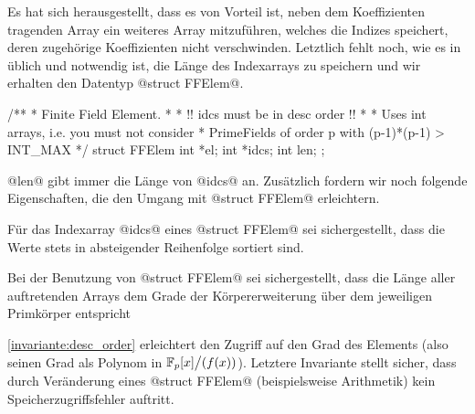 Es hat sich herausgestellt, dass es von Vorteil ist, neben dem Koeffizienten
tragenden Array ein weiteres Array mitzuführen, welches die
Indizes speichert, deren zugehörige Koeffizienten nicht verschwinden. Letztlich
fehlt noch, wie es in \Clang üblich und notwendig ist, die Länge des
Indexarrays zu speichern und wir erhalten den Datentyp @struct FFElem@.

\begin{ccode}[caption={Aus \url{../Sage/enumeratePCNs.c}},
  firstnumber=15]
/**
 * Finite Field Element. 
 * 
 * !! idcs must be in desc order !!
 *
 * Uses int arrays, i.e. you must not consider 
 * PrimeFields of order p with  (p-1)*(p-1) > INT_MAX
 */
struct FFElem{
    int *el;
    int *idcs;
    int len;
};
\end{ccode}

@len@ gibt immer die Länge von @idcs@ an. Zusätzlich fordern wir noch folgende
Eigenschaften, die den Umgang mit @struct FFElem@ erleichtern.

\begin{invariante}
  \label{invariante:desc_order}
  Für das Indexarray @idcs@ eines @struct FFElem@ sei sichergestellt, 
  dass die Werte stets in absteigender Reihenfolge sortiert sind. 
\end{invariante}

\begin{invariante}
  \label{invariante:array_len}
  Bei der Benutzung von @struct FFElem@ sei sichergestellt, 
  dass die Länge aller auftretenden Arrays dem Grade der 
  Körpererweiterung über dem jeweiligen Primkörper entspricht
\end{invariante}

\cref{invariante:desc_order} erleichtert den Zugriff auf
den Grad des Elements (also seinen Grad als Polynom in
$\mathbb{F}_p[x]\big/(f(x))$). Letztere Invariante stellt sicher, dass durch
Veränderung eines @struct FFElem@ (beispielsweise Arithmetik) kein 
Speicherzugriffsfehler auftritt.

